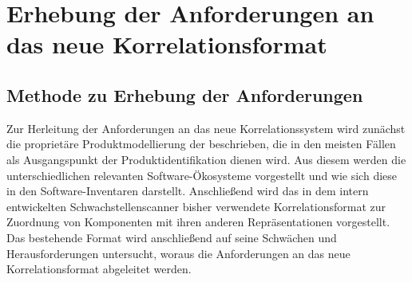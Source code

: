 \chapter{Erhebung der Anforderungen an das neue Korrelationsformat}\label{ch:anforderungen}


\section{Methode zu Erhebung der Anforderungen}

Zur Herleitung der Anforderungen an das neue Korrelationssystem wird zunächst die proprietäre Produktmodellierung der \metaeffektsp beschrieben, die in den meisten Fällen als Ausgangspunkt der Produktidentifikation dienen wird.
Aus diesem werden die unterschiedlichen relevanten Software-Ökosysteme vorgestellt und wie sich diese in den Software-Inventaren darstellt.
Anschließend wird das in dem intern entwickelten Schwachstellenscanner bisher verwendete Korrelationsformat zur Zuordnung von Komponenten mit ihren anderen Repräsentationen vorgestellt.
Das bestehende Format wird anschließend auf seine Schwächen und Herausforderungen untersucht, woraus die Anforderungen an das neue Korrelationsformat abgeleitet werden.











